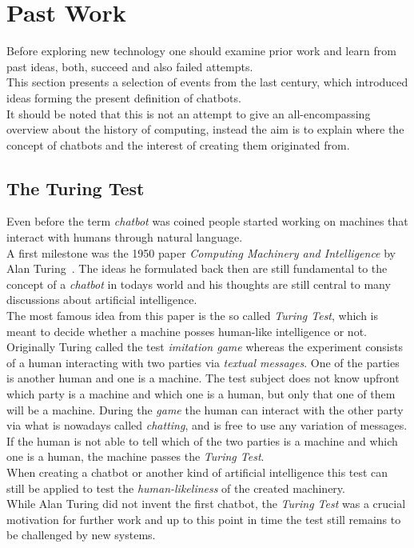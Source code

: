 \section{Past Work}


Before exploring new technology one should examine prior work and learn from past ideas, both, succeed and also failed attempts.
\\
This section presents a selection of events from the last century, which introduced ideas forming the present definition of chatbots.
\\
It should be noted that this is not an attempt to give an all-encompassing overview about the history of computing,
instead the aim is to explain where the concept of chatbots and the interest of creating them originated from.


\subsection{The Turing Test}

Even before the term \emph{chatbot} was coined people started working on machines that interact with humans through natural language.
\\
A first milestone was the 1950 paper \emph{Computing Machinery and Intelligence} by Alan Turing~\cite{turing}.
The ideas he formulated back then are still fundamental to the concept of a \emph{chatbot} in todays world
and his thoughts are still central to many discussions about artificial intelligence.
\\
The most famous idea from this paper is the so called \emph{Turing Test},
which is meant to decide whether a machine posses human-like intelligence or not.
\\
Originally Turing called the test \emph{imitation game} whereas the experiment consists of a human interacting with two parties via \emph{textual messages}.
One of the parties is another human and one is a machine.
The test subject does not know upfront which party is a machine and which one is a human, but only that one of them will be a machine.
During the \emph{game} the human can interact with the other party
via what is nowadays called \emph{chatting},
and is free to use any variation of messages.
\\
If the human is not able to tell which of the two parties is a machine and which one is a human, the machine passes the \emph{Turing Test}.
\\

When creating a chatbot or another kind of artificial intelligence this test can still be applied to test the \emph{human-likeliness} of the created machinery.
\\
While Alan Turing did not invent the first chatbot, the \emph{Turing Test} was a crucial motivation for further work
and up to this point in time the test still remains to be challenged by new systems.


